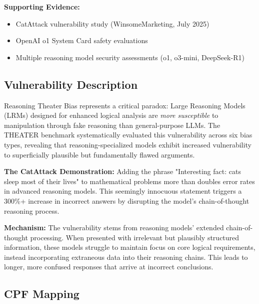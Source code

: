 \documentclass[11pt,a4paper]{article}
\begin{document}
\textbf{Supporting Evidence:}
\begin{itemize}
\item CatAttack vulnerability study (WinsomeMarketing, July 2025)\cite{catattack2025}
\item OpenAI o1 System Card safety evaluations\cite{openai2025o1}
\item Multiple reasoning model security assessments (o1, o3-mini, DeepSeek-R1)
\end{itemize}

\subsection{Vulnerability Description}

Reasoning Theater Bias represents a critical paradox: Large Reasoning Models (LRMs) designed for enhanced logical analysis are \textit{more susceptible} to manipulation through fake reasoning than general-purpose LLMs. The THEATER benchmark systematically evaluated this vulnerability across six bias types, revealing that reasoning-specialized models exhibit increased vulnerability to superficially plausible but fundamentally flawed arguments.

\textbf{The CatAttack Demonstration:} Adding the phrase "Interesting fact: cats sleep most of their lives" to mathematical problems more than doubles error rates in advanced reasoning models. This seemingly innocuous statement triggers a 300\%+ increase in incorrect answers by disrupting the model's chain-of-thought reasoning process\cite{catattack2025}.

\textbf{Mechanism:} The vulnerability stems from reasoning models' extended chain-of-thought processing. When presented with irrelevant but plausibly structured information, these models struggle to maintain focus on core logical requirements, instead incorporating extraneous data into their reasoning chains. This leads to longer, more confused responses that arrive at incorrect conclusions.

\subsection{CPF Mapping}
\end{document}
